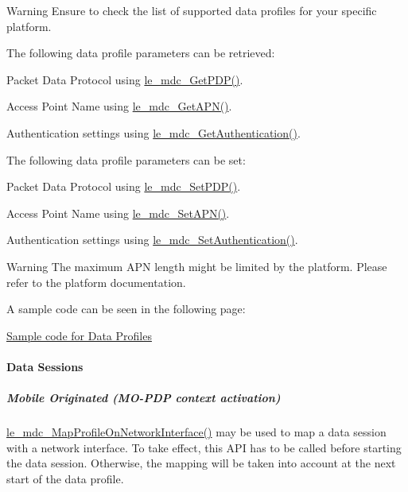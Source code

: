 \begin{DoxyWarning}{Warning}
Ensure to check the list of supported data profiles for your specific platform.
\end{DoxyWarning}
The following data profile parameters can be retrieved\+:
\begin{DoxyItemize}
\item Packet Data Protocol using \hyperlink{le__mdc__interface_8h_a0a51125579f1d5009dac03c79ddff498}{le\+\_\+mdc\+\_\+\+Get\+P\+D\+P()}.
\item Access Point Name using \hyperlink{le__mdc__interface_8h_afc0c149bfa4455f3e9a8ccc06f0c5fed}{le\+\_\+mdc\+\_\+\+Get\+A\+P\+N()}.
\item Authentication settings using \hyperlink{le__mdc__interface_8h_a3f83b1b922271091e3f1da418a4f39ca}{le\+\_\+mdc\+\_\+\+Get\+Authentication()}.
\end{DoxyItemize}

The following data profile parameters can be set\+:
\begin{DoxyItemize}
\item Packet Data Protocol using \hyperlink{le__mdc__interface_8h_a73e66a7a63dc95d7f261fc2a26470386}{le\+\_\+mdc\+\_\+\+Set\+P\+D\+P()}.
\item Access Point Name using \hyperlink{le__mdc__interface_8h_ae8ebd11b9cb9afb9b6b5745903f50156}{le\+\_\+mdc\+\_\+\+Set\+A\+P\+N()}.
\item Authentication settings using \hyperlink{le__mdc__interface_8h_a9f69d0751927b5ead6c756202179b222}{le\+\_\+mdc\+\_\+\+Set\+Authentication()}.
\end{DoxyItemize}

\begin{DoxyWarning}{Warning}
The maximum A\+PN length might be limited by the platform. Please refer to the platform documentation.
\end{DoxyWarning}
A sample code can be seen in the following page\+:
\begin{DoxyItemize}
\item \hyperlink{c_mdcDataProfiles}{Sample code for Data Profiles}
\end{DoxyItemize}\hypertarget{c_mdc_le_mdc_session}{}\paragraph{Data Sessions}\label{c_mdc_le_mdc_session}
\hypertarget{c_mdc_le_mdc_session_MO}{}\subparagraph{Mobile Originated (\+M\+O-\/\+P\+D\+P context activation)}\label{c_mdc_le_mdc_session_MO}
\hyperlink{le__mdc__interface_8h_a56cd547a4e2b9cc98c1f0d052aeb92e6}{le\+\_\+mdc\+\_\+\+Map\+Profile\+On\+Network\+Interface()} may be used to map a data session with a network interface. To take effect, this A\+PI has to be called before starting the data session. Otherwise, the mapping will be taken into account at the next start of the data profile.

